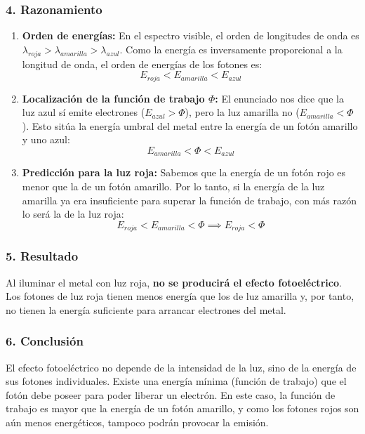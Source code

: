 \subsubsection*{4. Razonamiento}
\begin{enumerate}
    \item \textbf{Orden de energías:} En el espectro visible, el orden de longitudes de onda es $\lambda_{roja} > \lambda_{amarilla} > \lambda_{azul}$. Como la energía es inversamente proporcional a la longitud de onda, el orden de energías de los fotones es:
    $$ E_{roja} < E_{amarilla} < E_{azul} $$
    \item \textbf{Localización de la función de trabajo $\Phi$:} El enunciado nos dice que la luz azul sí emite electrones ($E_{azul} > \Phi$), pero la luz amarilla no ($E_{amarilla} < \Phi$). Esto sitúa la energía umbral del metal entre la energía de un fotón amarillo y uno azul:
    $$ E_{amarilla} < \Phi < E_{azul} $$
    \item \textbf{Predicción para la luz roja:} Sabemos que la energía de un fotón rojo es menor que la de un fotón amarillo. Por lo tanto, si la energía de la luz amarilla ya era insuficiente para superar la función de trabajo, con más razón lo será la de la luz roja:
    $$ E_{roja} < E_{amarilla} < \Phi \implies E_{roja} < \Phi $$
\end{enumerate}

\subsubsection*{5. Resultado}
\begin{cajaresultado}
Al iluminar el metal con luz roja, \textbf{no se producirá el efecto fotoeléctrico}. Los fotones de luz roja tienen menos energía que los de luz amarilla y, por tanto, no tienen la energía suficiente para arrancar electrones del metal.
\end{cajaresultado}

\subsubsection*{6. Conclusión}
\begin{cajaconclusion}
El efecto fotoeléctrico no depende de la intensidad de la luz, sino de la energía de sus fotones individuales. Existe una energía mínima (función de trabajo) que el fotón debe poseer para poder liberar un electrón. En este caso, la función de trabajo es mayor que la energía de un fotón amarillo, y como los fotones rojos son aún menos energéticos, tampoco podrán provocar la emisión.
\end{cajaconclusion}

